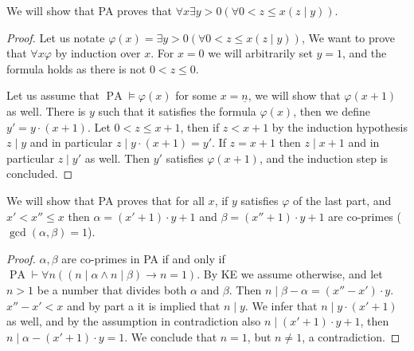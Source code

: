 \question{}
\subquestion{}
We will show that PA proves that $\forall x \exists y > 0 (\forall 0 < z \le x (z \mid y))$.
\begin{proof}
	Let us notate $\varphi(x) = \exists y > 0 (\forall 0 < z \le x (z \mid y))$, We want to prove that $\forall x \varphi$ by induction over $x$.
	For $x = 0$ we will arbitrarily set $y = 1$, and the formula holds as there is not $0 < z \le 0$.

	Let us assume that $\operatorname{PA} \models \varphi(x)$ for some $x = \underline{n}$, we will show that $\varphi(x + 1)$ as well.
	There is $y$ such that it satisfies the formula $\varphi(x)$, then we define $y' = y \cdot (x + 1)$.
	Let $0 < z \le x + 1$, then if $z < x + 1$ by the induction hypothesis $z \mid y$ and in particular $z \mid y \cdot (x + 1) = y'$.
	If $z = x + 1$ then $z \mid x + 1$ and in particular $z \mid y'$ as well.
	Then $y'$ satisfies $\varphi(x + 1)$, and the induction step is concluded.
\end{proof}

\subquestion{}
We will show that PA proves that for all $x$, if $y$ satisfies $\varphi$ of the last part,
and $x' < x'' \le x$ then $\alpha = (x' + 1) \cdot y + 1$ and $\beta = (x'' + 1) \cdot y + 1$ are co-primes ($\gcd(\alpha, \beta) = 1$).
\begin{proof}
	$\alpha, \beta$ are co-primes in PA if and only if $\operatorname{PA} \vdash \forall n ((n \mid \alpha \land n \mid \beta) \rightarrow n = 1)$.
	By KE we assume otherwise, and let $n > 1$ be a number that divides both $\alpha$ and $\beta$.
	Then $n \mid \beta - \alpha = (x'' - x') \cdot y$.
	$x'' - x' < x$ and by part a it is implied that $n \mid y$.
	We infer that $n \mid y \cdot (x' + 1)$ as well, and by the assumption in contradiction also $n \mid (x' + 1) \cdot y + 1$, then $n \mid \alpha - (x' + 1) \cdot y = 1$.
	We conclude that $n = 1$, but $n \ne 1$, a contradiction.
\end{proof}

